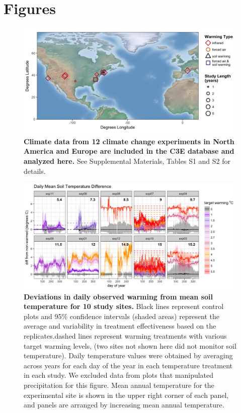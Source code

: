 \documentclass{article}
\begin{document}
\section* {Figures}
\begin{figure}[p]
\centering
\includegraphics{../Analyses/maps/RadcliffeLocations_Experiments_Open.png} 
\caption{\textbf{Climate data from 12 climate change experiments in North America and Europe are included in the C3E database and analyzed here.} See Supplemental Materials, Tables S1 and S2 for details.} 
 \label{fig:map}
 \end{figure}
\clearpage
\begin{figure}[h]
\centering
 \includegraphics{../Analyses/figures/WarmingEffects_TimeSeries_SoilTemp1Mean_Deviation_NoPrecip.png}
 \caption{\textbf{Deviations in daily observed warming from mean soil temperature for 10 study sites.} Black lines represent control plots and 95\% confidence intervals (shaded areas) represent the average and variability in treatment effectiveness based on the replicates.dashed lines represent warming treatments with various target warming levels, (two sites not shown here did not monitor soil temperature). %
Daily temperature values were obtained by averaging across years for each day of the year in each temperature treatment in each study. We excluded data from plots that manipulated precipitation for this figure. Mean annual temperature for the experimental site is shown in the upper right corner of each panel, and panels are arranged by increasing mean annual temperature.}
 \label{fig:effwarm}

 \end{figure}
\end{document}
